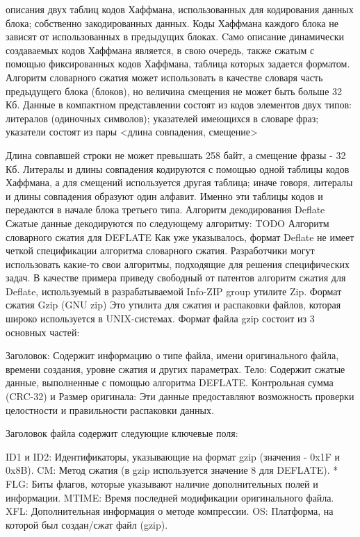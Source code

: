 \documentclass[12pt]{article}
\begin{document}
описания двух таблиц кодов Хаффмана, использованных для кодирования данных блока;
собственно закодированных данных.
Коды Хаффмана каждого блока не зависят от использованных в предыдущих блоках. Cамо описание динамически создаваемых кодов Хаффмана является, в свою очередь, также сжатым с помощью фиксированных кодов Хаффмана, таблица которых задается форматом.
Алгоритм словарного сжатия может использовать в качестве словаря часть предыдущего блока (блоков), но величина смещения не может быть больше 32 Кб. Данные в компактном представлении состоят из кодов элементов двух типов:
литералов (одиночных символов);
указателей имеющихся в словаре фраз; указатели состоят из пары <длина совпадения, смещение>

Длина совпавшей строки не может превышать 258 байт, а смещение фразы - 32 Кб. Литералы и длины совпадения кодируются с помощью одной таблицы кодов Хаффмана, а для смещений используется другая таблица; иначе говоря, литералы и длины совпадения образуют один алфавит. Именно эти таблицы кодов и передаются в начале блока третьего типа.
Алгоритм декодирования Deflate
Сжатые данные декодируются по следующему алгоритму:
TODO
Алгоритм словарного сжатия для DEFLATE
Как уже указывалось, формат Deflate не имеет четкой спецификации алгоритма словарного сжатия. Разработчики могут использовать какие-то свои алгоритмы, подходящие для решения специфических задач.
В качестве примера приведу свободный от патентов алгоритм сжатия для Deflate, используемый в разрабатываемой Info-ZIP group утилите Zip.
Формат сжатия Gzip (GNU zip)
Это утилита для сжатия и распаковки файлов, которая широко используется в UNIX-системах.
Формат файла gzip состоит из 3 основных частей:

Заголовок: Содержит информацию о типе файла, имени оригинального файла, времени создания, уровне сжатия и других параметрах.
Тело: Содержит сжатые данные, выполненные с помощью алгоритма DEFLATE.
Контрольная сумма (CRC-32) и Размер оригинала: Эти данные предоставляют возможность проверки целостности и правильности распаковки данных.

Заголовок файла содержит следующие ключевые поля:

ID1 и ID2: Идентификаторы, указывающие на формат gzip (значения - 0x1F и 0x8B).
CM: Метод сжатия (в gzip используется значение 8 для DEFLATE). *
FLG: Биты флагов, которые указывают наличие дополнительных полей и информации.
MTIME: Время последней модификации оригинального файла.
XFL: Дополнительная информация о методе компрессии.
OS: Платформа, на которой был создан/сжат файл (gzip).
\end{document}
